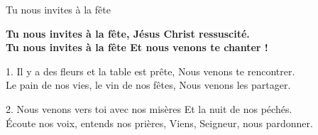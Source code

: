 Tu nous invites à la fête

\textbf{Tu nous invites à la fête, Jésus Christ ressuscité.\\
Tu nous invites à la fête Et nous venons te chanter !}

1. Il y a des fleurs et la table est prête,
Nous venons te rencontrer.\\
Le pain de nos vies, le vin de nos fêtes,
Nous venons les partager.

2.
Nous venons vers toi avec nos misères
Et la nuit de nos péchés.\\
Écoute nos voix, entends nos prières,
Viens, Seigneur, nous pardonner.
